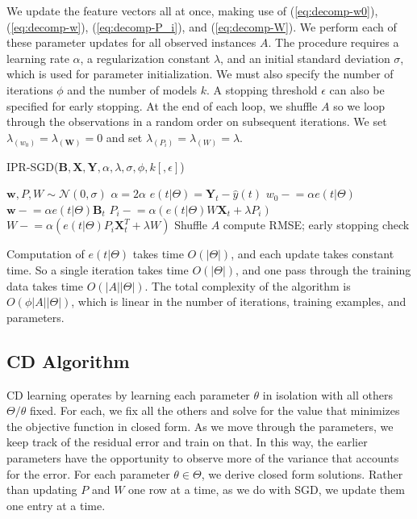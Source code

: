 \documentclass[10pt]{proc}
\newcommand{\mineq}{\mathrel{-}=}
\newcommand{\elips}[1]{\ldots#1\allowbreak}
\begin{document}
We update the feature vectors all at once, making use of (\ref{eq:decomp-w0}),
(\ref{eq:decomp-w}), (\ref{eq:decomp-P_i}), and (\ref{eq:decomp-W}). We perform
each of these parameter updates for all observed instances $A$. The procedure
requires a learning rate $\alpha$, a regularization constant $\lambda$, and an
initial standard deviation $\sigma$, which is used for parameter initialization.
We must also specify the number of iterations $\phi$ and the number of models
$k$. A stopping threshold $\epsilon$ can also be specified for early stopping.
At the end of each loop, we shuffle $A$ so we loop through the observations in a
random order on subsequent iterations. We set $\lambda_{(w_0)} =
\lambda_{(\bm{W})} = 0$ and set $\lambda_{(P_i)} = \lambda_{(W)} = \lambda$.

\begin{algorithm}  \label{alg:ipr-sgd}
    \caption{IPR-SGD($\bm{B}, \bm{X}, \bm{Y}, \alpha, \lambda, \sigma, \phi, k[, \epsilon]$)}
    \begin{algorithmic}[1]
        \State $\bm{w}, P, W \sim \mathcal{N}(0, \sigma)$
        \State $\alpha = 2 \alpha$
        \For{iteration in $\{1, \elips{,} \phi\}$}
                \State $e(t | \Theta) = \bm{Y}_t - \hat{y}(t)$
                \State $w_0 \mineq \alpha e(t | \Theta)$
                \State $\bm{w} \mineq \alpha e(t | \Theta)\bm{B}_t$
                \State $P_i \mineq \alpha (e(t | \Theta) W \bm{X}_t + \lambda P_i)$
                \State $W \mineq \alpha (e(t | \Theta) P_i \bm{X}_t^T + \lambda W)$
            \EndFor
            \State Shuffle $A$
                \State compute RMSE; early stopping check
            \EndIf
        \EndFor
    \end{algorithmic}
\end{algorithm}

Computation of $e(t | \Theta)$ takes time $O(|\Theta|)$, and each update takes
constant time. So a single iteration takes time $O(|\Theta|)$, and one pass
through the training data takes time $O(|A||\Theta|)$. The total complexity of
the algorithm is $O(\phi|A||\Theta|)$, which is linear in the number of
iterations, training examples, and parameters.

\subsection{CD Algorithm}

CD learning operates by learning each parameter $\theta$ in isolation with all others
$\Theta / \theta$ fixed. For each, we fix all the others and solve for the value
that minimizes the objective function in closed form. As we move through the
parameters, we keep track of the residual error and train on that. In this way,
the earlier parameters have the opportunity to observe more of the variance that
accounts for the error. For each parameter $\theta \in \Theta$, we derive closed
form solutions. Rather than updating $P$ and $W$ one row at a time, as we do
with SGD, we update them one entry at a time.
\end{document}
